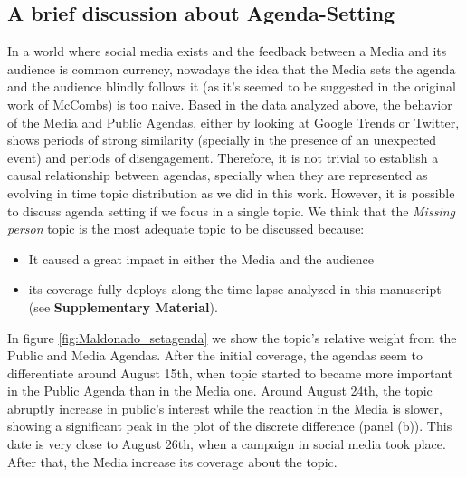 \documentclass{bmcart}
\begin{document}
\subsection*{A brief discussion about  Agenda-Setting}
\label{sec:who_sets}

\par In a world where social media exists and the feedback between a Media and its audience is common currency, nowadays the idea that the Media sets the agenda and the audience blindly follows it (as it's seemed to be suggested in the original work of McCombs) is too naive. Based in the data analyzed above, the behavior of the Media  and Public Agendas, either by looking at Google Trends or Twitter, shows periods of strong similarity  (specially in the presence of an unexpected event) and periods of disengagement. Therefore, it is not trivial to establish a causal relationship between agendas, specially when they are represented as evolving in time topic distribution as we did in this work. However, it is possible to discuss agenda setting if we focus in a single topic. We think that the \emph{Missing person} topic is the most adequate topic to be discussed because:
\begin{itemize} 
\item It caused a great impact in either the Media and the audience
\item  its coverage fully deploys along the time lapse analyzed in this manuscript (see \textbf{Supplementary Material}).
\end{itemize}

\par In figure \ref{fig:Maldonado_setagenda} we show the topic's relative weight from the Public and Media Agendas.  After the initial coverage, the agendas seem to differentiate around August 15th, when topic started to became more important in the Public Agenda than in the Media one. Around August 24th, the topic abruptly increase in public's interest while the reaction in the Media is slower, showing a significant peak in the plot of the discrete difference (panel (b)). This date is very close to August 26th, when a campaign in social media took place. After that, the Media increase its coverage about the topic. 
\end{document}
